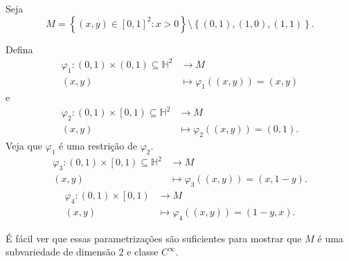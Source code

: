 \begin{eg}
    Seja \[
    M = \left\{ \left( x,y \right) \in \left[ 0,1 \right] ^2 : x > 0 \right\} \setminus \left\{ \left( 0,1 \right) , \left( 1,0 \right) , \left( 1,1 \right)  \right\} 
    .\] 

    Defina
    \begin{align*}
        \varphi_1: \left( 0,1 \right) \times \left( 0,1 \right) \subseteq \mathbb{H}^{2} &\longrightarrow M \\
        \left( x,y \right)  &\longmapsto \varphi_1(\left( x,y \right) ) = \left( x,y \right) 
    \end{align*}
    e
    \begin{align*}
	\varphi _2: \left( 0,1 \right) \times \left[ 0,1 \right) \subseteq \mathbb{H}^{2} &\longrightarrow M \\
        \left( x,y \right)  &\longmapsto 	\varphi _2(\left( x,y \right) ) = \left( 0,1 \right)
    .\end{align*}
    Veja que $\varphi _1$ é uma restrição de $\varphi _2$.
    \begin{align*}
	\varphi _3: \left( 0,1 \right) \times \left[ 0,1 \right)\subseteq\mathbb{H}^{2} &\longrightarrow M \\
        \left( x,y \right)  &\longmapsto 	\varphi _3(\left( x,y \right) ) = \left( x, 1-y \right)
    .\end{align*}
    \begin{align*}
	\varphi _4: \left( 0,1 \right) \times \left[ 0,1 \right) &\longrightarrow M \\
        \left( x,y \right)  &\longmapsto 	\varphi _4(\left( x,y \right) ) = \left( 1-y, x \right)
    .\end{align*}

    É fácil ver que essas parametrizações são suficientes para mostrar que $M$ é uma subvariedade de dimensão 2 e classe $C^{\infty}$.
\end{eg}

